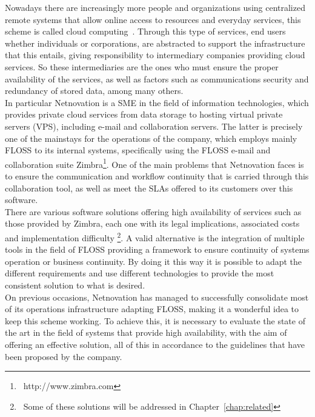 \documentclass[a4paper, 12pt]{book}
\begin{document}
\noindent Nowadays there are increasingly more people and organizations using centralized remote systems that allow online access to resources and everyday services, this scheme is called cloud computing~\cite{Mell & Grance}. Through this type of services, end users whether individuals or corporations, are abstracted to support the infrastructure that this entails, giving responsibility to intermediary companies providing cloud services. So these intermediaries are the ones who must ensure the proper availability of the services, as well as factors such as communications security and redundancy of stored data, among many others.\\

\noindent In particular Netnovation is a SME in the field of information technologies, which provides private cloud services from data storage to hosting virtual private servers (VPS), including e-mail and collaboration servers. The latter is precisely one of the mainstays for the operations of the company, which employs mainly FLOSS to its internal systems, specifically using the FLOSS e-mail and collaboration suite Zimbra\texttrademark \footnote{\ http://www.zimbra.com}. One of the main problems that Netnovation faces is to ensure the communication and workflow continuity that is carried through this collaboration tool, as well as meet the SLAs offered to its customers over this software.\\

\noindent There are various software solutions offering high availability of services such as those provided by Zimbra, each one with its legal implications, associated costs and implementation difficulty \footnote{\ Some of these solutions will be addressed in Chapter~\ref{chap:related}}. A valid alternative is the integration of multiple tools in the field of FLOSS providing a framework to ensure  continuity of systems operation or business continuity. By doing it this way it is possible to adapt the different requirements and use different technologies to provide the most consistent solution to what is desired.\\

\noindent On previous occasions, Netnovation has managed to successfully consolidate most of its operations infrastructure adapting FLOSS, making it a wonderful idea to keep this scheme working. To achieve this, it is necessary to evaluate the state of the art in the field of systems that provide high availability, with the aim of offering an effective solution, all of this in accordance to the guidelines that have been proposed by the company.
\end{document}
